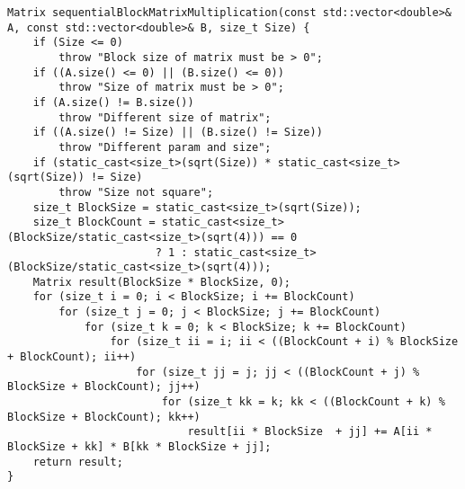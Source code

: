 \documentclass{report}
\begin{document}
\begin{lstlisting}
Matrix sequentialBlockMatrixMultiplication(const std::vector<double>& A, const std::vector<double>& B, size_t Size) {
    if (Size <= 0)
        throw "Block size of matrix must be > 0";
    if ((A.size() <= 0) || (B.size() <= 0))
        throw "Size of matrix must be > 0";
    if (A.size() != B.size())
        throw "Different size of matrix";
    if ((A.size() != Size) || (B.size() != Size))
        throw "Different param and size";
    if (static_cast<size_t>(sqrt(Size)) * static_cast<size_t>(sqrt(Size)) != Size)
        throw "Size not square";
    size_t BlockSize = static_cast<size_t>(sqrt(Size));
    size_t BlockCount = static_cast<size_t>(BlockSize/static_cast<size_t>(sqrt(4))) == 0
                       ? 1 : static_cast<size_t>(BlockSize/static_cast<size_t>(sqrt(4)));
    Matrix result(BlockSize * BlockSize, 0);
    for (size_t i = 0; i < BlockSize; i += BlockCount)
        for (size_t j = 0; j < BlockSize; j += BlockCount)
            for (size_t k = 0; k < BlockSize; k += BlockCount)
                for (size_t ii = i; ii < ((BlockCount + i) % BlockSize + BlockCount); ii++)
                    for (size_t jj = j; jj < ((BlockCount + j) % BlockSize + BlockCount); jj++)
                        for (size_t kk = k; kk < ((BlockCount + k) % BlockSize + BlockCount); kk++)
                            result[ii * BlockSize  + jj] += A[ii * BlockSize + kk] * B[kk * BlockSize + jj];
    return result;
}


\end{lstlisting}
\end{document}
